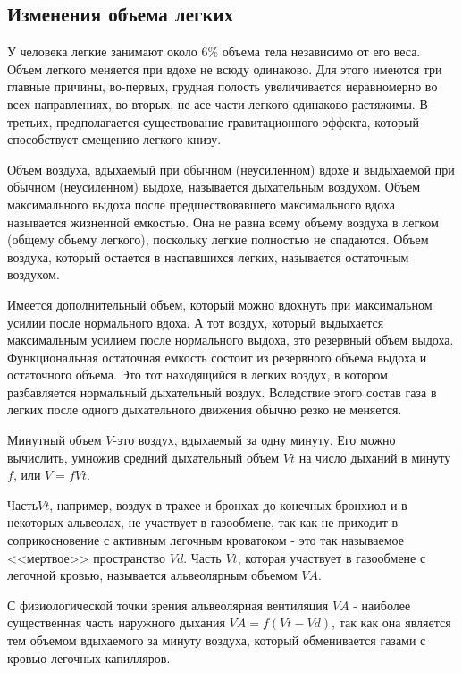\documentclass[a4paper,14pt]{extreport}
\begin{document}
\subsection{Изменения объема легких}

У человека легкие  занимают  около  6\%  объема  тела   независимо  от  его  веса.  Объем легкого меняется при вдохе не всюду одинаково. Для  этого имеются три главные причины, во-первых, грудная полость  увеличивается неравномерно во всех направлениях, во-вторых, не асе части легкого одинаково растяжимы. В-третьих, предполагается существование гравитационного эффекта, который способствует смещению легкого книзу.

Объем воздуха, вдыхаемый при обычном (неусиленном) вдохе и выдыхаемой при обычном (неусиленном) выдохе, называется  дыхательным воздухом. Объем максимального выдоха после  предшествовавшего максимального вдоха называется жизненной емкостью. Она не равна всему объему воздуха в легком (общему объему легкого), поскольку легкие полностью не спадаются. Объем воздуха, который остается в наспавшихся легких, называется остаточным воздухом. 

 Имеется дополнительный объем,  который можно вдохнуть при максимальном усилии после нормального вдоха. 
А тот воздух, который выдыхается максимальным усилием после нормального выдоха, это резервный объем  выдоха. Функциональная остаточная емкость состоит из резервного объема выдоха и остаточного объема. Это тот находящийся в легких воздух, в котором разбавляется нормальный дыхательный воздух. Вследствие этого состав газа в легких после одного дыхательного движения обычно резко не меняется.

Минутный объем $V$-это воздух, вдыхаемый за одну минуту. Его можно вычислить, умножив средний  дыхательный объем $Vt$ на число дыханий в минуту $f$, или $V=fVt$. 

Часть$ Vt$, например, воздух в трахее и бронхах до конечных бронхиол и в некоторых  альвеолах, не участвует в газообмене, так как  не  приходит  в  соприкосновение  с  активным  легочным кроватоком  -  это  так  называемое  <<мертвое>> пространство $Vd$.  Часть  $Vt$,  которая  участвует  в  газообмене  с легочной  кровью,  называется  альвеолярным  объемом $VA$.

 С физиологической  точки  зрения  альвеолярная   вентиляция  $VA$ - наиболее существенная  часть  наружного дыхания   $VA=f(Vt-Vd)$,  так   как  она  является  тем  объемом  вдыхаемого  за  минуту  воздуха,  который  обменивается  газами  с  кровью  легочных  капилляров. 
\end{document}
